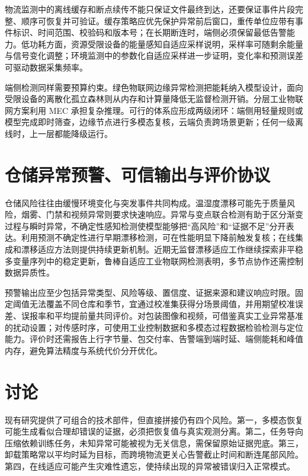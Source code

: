 \documentclass[11pt,a4paper]{article}
\begin{document}
物流监测中的离线缓存和断点续传不能只保证文件最终到达，还要保证事件片段完整、顺序可恢复并可验证。缓存策略应优先保护异常前后窗口，重传单位应带有事件标识、时间范围、校验码和版本号；在长期断连时，端侧必须保留最低告警能力。低功耗方面，资源受限设备的能量感知自适应采样说明，采样率可随剩余能量与信号变化调整\cite{energyawareadaptive2023}；环境监测中的参数化自适应采样进一步证明，变化率和预测误差可驱动数据采集频率\cite{parametricmachinelearning2024}。

端侧检测同样需要预算约束。绿色物联网边缘异常检测把能耗纳入模型设计\cite{deeplearningdriven2024}，面向受限设备的离散化孤立森林则从内存和计算量降低无监督检测开销\cite{discretizedisolationforest2025}。分层工业物联网方案利用 MEC 承担复杂推理\cite{anomalydetectionfor2025}。可行的体系应形成两级闭环：端侧用轻量规则或模型完成即时筛查，边缘节点进行多模态复核，云端负责跨场景更新；任何一级离线时，上一层都能降级运行。

\section{仓储异常预警、可信输出与评价协议}

仓储风险往往由缓慢环境变化与突发事件共同构成。温湿度漂移可能先于质量风险，烟雾、门禁和视频异常则要求快速响应。异常与变点联合检测有助于区分渐变过程与瞬时异常\cite{anomalyandchange2023}，不确定性感知检测使模型能够把“高风险”和“证据不足”分开表达\cite{uncertaintyawaretime2024}。利用预测不确定性进行早期漂移检测，可在性能明显下降前触发复核\cite{earlyconceptdrift2025}；在线集成和漂移适应方法则提供持续更新机制\cite{ensemblebasedunsupervised2024}。近期无监督漂移适应工作继续探索非平稳多变量序列中的稳定更新\cite{unsupervisedconceptdrift2025}，鲁棒自适应工业物联网检测表明，多节点协作还需控制数据异质性\cite{fedramfederated2025}。

预警输出应至少包括异常类型、风险等级、置信度、证据来源和建议响应时限。固定阈值无法覆盖不同仓库和季节，宜通过校准集获得分场景阈值，并用期望校准误差、误报率和平均提前量共同评价。对包装图像和视频，可借鉴真实工业异常基准的扰动设置；对传感时序，可使用工业控制数据和多模态过程数据检验检测与定位能力\cite{industrialcontrolsystem2024,amultimodaldataset2025}。评价时还需报告上行字节量、包交付率、告警端到端时延、端侧能耗和峰值内存，避免算法精度与系统代价分开优化。

\section{讨论}

现有研究提供了可组合的技术部件，但直接拼接仍有四个风险。第一，多模态恢复可能生成看似合理却错误的证据，必须把恢复值与真实观测分离。第二，任务导向压缩依赖训练任务，未知异常可能被视为无关信息，需保留原始证据兜底。第三，卸载策略常以平均时延为目标，而跨境物流更关心告警截止时间和断连尾部风险。第四，在线适应可能产生灾难性遗忘，使持续出现的异常被错误归入正常模式。
\end{document}
